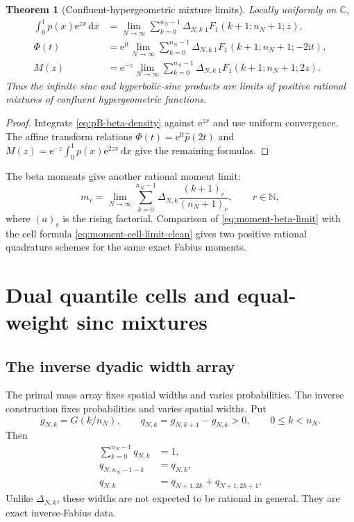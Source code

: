 \documentclass[11pt,oneside]{article}
\newtheorem{theorem}{Theorem}[section]
\theoremstyle{definition}
\theoremstyle{remark}
\newcommand{\C}{\mathbb C}
\newcommand{\N}{\mathbb N}
\newcommand{\e}{\mathrm e}
\newcommand{\ii}{\mathrm i}
\newcommand{\dd}{\,\mathrm d}
\begin{document}
\begin{theorem}[Confluent-hypergeometric mixture limits]
\label{thm:hypergeometric-mixture}
Locally uniformly on $\C$,
\begin{align}
 \int_0^1p(x)\e^{zx}\dd x
 &=\lim_{N\to\infty}\sum_{k=0}^{n_N-1}
 \Delta_{N,k}\,{}_1F_1(k+1;n_N+1;z),
 \label{eq:p-MGF-beta}\\
 \Phi(t)
 &=\e^{\ii t}\lim_{N\to\infty}\sum_{k=0}^{n_N-1}
 \Delta_{N,k}\,{}_1F_1(k+1;n_N+1;-2\ii t),
 \label{eq:Phi-beta}\\
 M(z)
 &=\e^{-z}\lim_{N\to\infty}\sum_{k=0}^{n_N-1}
 \Delta_{N,k}\,{}_1F_1(k+1;n_N+1;2z).
 \label{eq:M-beta}
\end{align}
Thus the infinite sinc and hyperbolic-sinc products are limits of positive
rational mixtures of confluent hypergeometric functions.
\end{theorem}

\begin{proof}
Integrate \eqref{eq:pB-beta-density} against $\e^{zx}$ and use uniform
convergence.  The affine transform relations
$\Phi(t)=\e^{\ii t}\widehat p(2t)$ and
$M(z)=\e^{-z}\int_0^1p(x)\e^{2zx}\dd x$ give the remaining formulas.
\end{proof}

The beta moments give another rational moment limit:
\begin{equation}\label{eq:moment-beta-limit}
 m_r=\lim_{N\to\infty}
 \sum_{k=0}^{n_N-1}\Delta_{N,k}
 \frac{(k+1)_r}{(n_N+1)_r},
 \qquad r\in\N,
\end{equation}
where $(a)_r$ is the rising factorial.  Comparison of
\eqref{eq:moment-beta-limit} with the cell formula
\eqref{eq:moment-cell-limit-clean} gives two positive rational quadrature
schemes for the same exact Fabius moments.

\section{Dual quantile cells and equal-weight sinc mixtures}
\label{sec:quantile-cells}

\subsection{The inverse dyadic width array}

The primal mass array fixes spatial widths and varies probabilities.  The
inverse construction fixes probabilities and varies spatial widths.  Put
\begin{equation}\label{eq:gNk-qNk}
 g_{N,k}=G(k/n_N),
 \qquad
 q_{N,k}=g_{N,k+1}-g_{N,k}>0,
 \qquad 0\le k<n_N.
\end{equation}
Then
\begin{align}
 \sum_{k=0}^{n_N-1}q_{N,k}&=1,\label{eq:q-sum}\\
 q_{N,n_N-1-k}&=q_{N,k},\label{eq:q-symmetry}\\
 q_{N,k}&=q_{N+1,2k}+q_{N+1,2k+1}.
 \label{eq:q-projective}
\end{align}
Unlike $\Delta_{N,k}$, these widths are not expected to be rational in general.
They are exact inverse-Fabius data.
\end{document}
